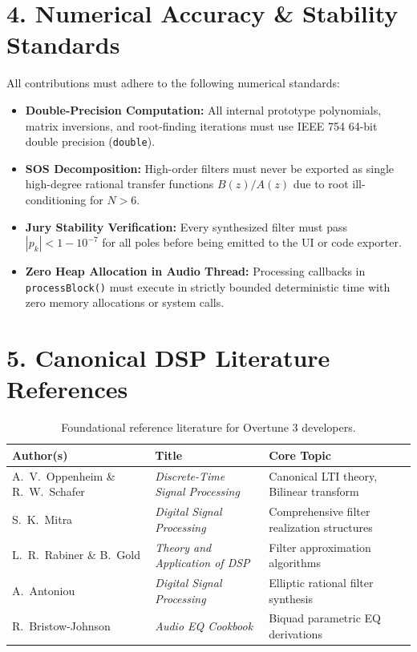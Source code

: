 \documentclass[11pt,a4paper]{article}
\begin{document}
\section*{4. Numerical Accuracy \& Stability Standards}

All contributions must adhere to the following numerical standards:
\begin{itemize}[leftmargin=20pt,itemsep=2pt]
\item \textbf{Double-Precision Computation:} All internal prototype polynomials, matrix inversions, and root-finding iterations must use IEEE 754 64-bit double precision (\texttt{double}).
\item \textbf{SOS Decomposition:} High-order filters must never be exported as single high-degree rational transfer functions $B(z)/A(z)$ due to root ill-conditioning for $N > 6$.
\item \textbf{Jury Stability Verification:} Every synthesized filter must pass $|p_k| < 1 - 10^{-7}$ for all poles before being emitted to the UI or code exporter.
\item \textbf{Zero Heap Allocation in Audio Thread:} Processing callbacks in \texttt{processBlock()} must execute in strictly bounded deterministic time with zero memory allocations or system calls.
\end{itemize}

\section*{5. Canonical DSP Literature References}
\begin{table}[h!]
\centering
\small
\renewcommand{\arraystretch}{1.15}
\begin{tabular}{lll}
\toprule
\textbf{Author(s)} & \textbf{Title} & \textbf{Core Topic} \\
\midrule
A.~V.~Oppenheim \& R.~W.~Schafer & \textit{Discrete-Time Signal Processing} & Canonical LTI theory, Bilinear transform \\
S.~K.~Mitra & \textit{Digital Signal Processing} & Comprehensive filter realization structures \\
L.~R.~Rabiner \& B.~Gold & \textit{Theory and Application of DSP} & Filter approximation algorithms \\
A.~Antoniou & \textit{Digital Signal Processing} & Elliptic rational filter synthesis \\
R.~Bristow-Johnson & \textit{Audio EQ Cookbook} & Biquad parametric EQ derivations \\
\bottomrule
\end{tabular}
\caption{Foundational reference literature for Overtune 3 developers.}
\end{table}
\end{document}
